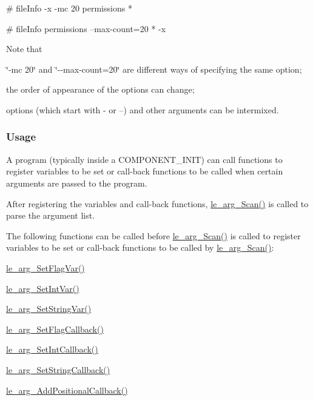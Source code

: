 \begin{DoxyVerb}# fileInfo -x -mc 20 permissions *
\end{DoxyVerb}


\begin{DoxyVerb}# fileInfo permissions --max-count=20 * -x
\end{DoxyVerb}


Note that
\begin{DoxyItemize}
\item \char`\"{}-\/mc 20\char`\"{} and \char`\"{}-\/-\/max-\/count=20\char`\"{} are different ways of specifying the same option;
\item the order of appearance of the options can change;
\item options (which start with \textquotesingle{}-\/\textquotesingle{} or \textquotesingle{}--\textquotesingle{}) and other arguments can be intermixed.
\end{DoxyItemize}\hypertarget{c_args_c_args_scanner_usage}{}\subsubsection{Usage}\label{c_args_c_args_scanner_usage}
A program (typically inside a {\ttfamily C\+O\+M\+P\+O\+N\+E\+N\+T\+\_\+\+I\+N\+I\+T}) can call functions to register variables to be set or call-\/back functions to be called when certain arguments are passed to the program.

After registering the variables and call-\/back functions, \hyperlink{le__args_8h_af44485fc914a7ac6f562d23d66c3410c}{le\+\_\+arg\+\_\+\+Scan()} is called to parse the argument list.

The following functions can be called before \hyperlink{le__args_8h_af44485fc914a7ac6f562d23d66c3410c}{le\+\_\+arg\+\_\+\+Scan()} is called to register variables to be set or call-\/back functions to be called by \hyperlink{le__args_8h_af44485fc914a7ac6f562d23d66c3410c}{le\+\_\+arg\+\_\+\+Scan()}\+:


\begin{DoxyItemize}
\item \hyperlink{le__args_8h_a889bb72c62d8590d61170a069219e852}{le\+\_\+arg\+\_\+\+Set\+Flag\+Var()}
\item \hyperlink{le__args_8h_a27f1486b1e855559158e218a7d93ce73}{le\+\_\+arg\+\_\+\+Set\+Int\+Var()}
\item \hyperlink{le__args_8h_a56d0b80e404966a00c87ec662fea23a8}{le\+\_\+arg\+\_\+\+Set\+String\+Var()}
\item \hyperlink{le__args_8h_a4594892b35d4e0a6d7551e9c371919fc}{le\+\_\+arg\+\_\+\+Set\+Flag\+Callback()}
\item \hyperlink{le__args_8h_a40e96c54132708b0637c3d696e3d060d}{le\+\_\+arg\+\_\+\+Set\+Int\+Callback()}
\item \hyperlink{le__args_8h_a41b845bab467f4b1e7fcae3d600e88b2}{le\+\_\+arg\+\_\+\+Set\+String\+Callback()}
\item \hyperlink{le__args_8h_a525bef6095a4655e97008e27a4829d44}{le\+\_\+arg\+\_\+\+Add\+Positional\+Callback()}
\end{DoxyItemize}

